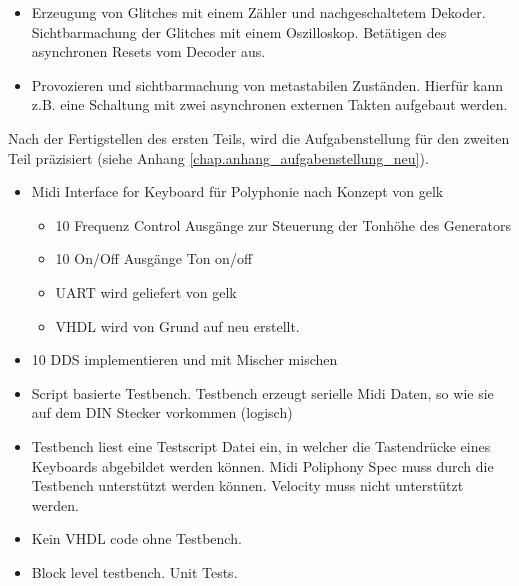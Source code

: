 \begin{itemize}
	\item Erzeugung von Glitches mit einem Zähler und nachgeschaltetem Dekoder. Sichtbarmachung der Glitches mit einem Oszilloskop. Betätigen des asynchronen Resets vom Decoder aus.

	\item Provozieren und sichtbarmachung von metastabilen Zuständen. Hierfür kann z.B. eine Schaltung mit zwei asynchronen externen Takten aufgebaut werden.
\end{itemize}  


Nach der Fertigstellen des ersten Teils, wird die Aufgabenstellung für den zweiten Teil präzisiert (siehe Anhang \ref{chap.anhang_aufgabenstellung_neu}).

\begin{itemize}
\item Midi Interface for Keyboard für Polyphonie nach Konzept von gelk
\begin{itemize}
    \item 10 Frequenz Control Ausgänge zur Steuerung der Tonhöhe des Generators
    \item 10 On/Off Ausgänge Ton on/off
    \item UART wird geliefert von gelk
    \item VHDL wird von Grund auf neu erstellt.
\end{itemize}
\item 10 DDS implementieren und mit Mischer mischen
\item Script basierte Testbench. Testbench erzeugt serielle Midi Daten, so wie sie auf dem DIN Stecker vorkommen (logisch)
\item Testbench liest eine Testscript Datei ein, in welcher die Tastendrücke eines Keyboards abgebildet werden können. Midi Poliphony Spec muss durch die Testbench unterstützt werden können. Velocity muss nicht unterstützt werden.
\item Kein VHDL code ohne Testbench.
\item Block level testbench. Unit Tests.
\end{itemize}
